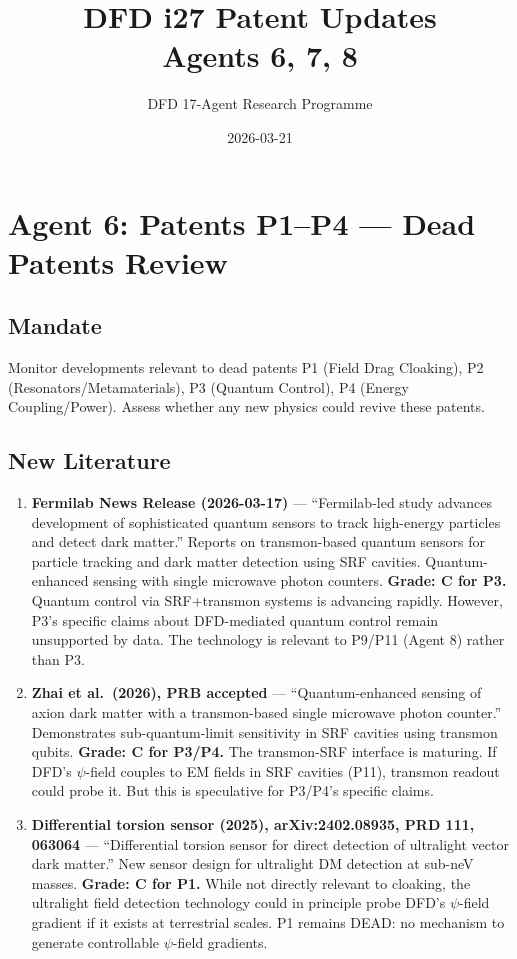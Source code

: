 \documentclass[11pt,a4paper]{article}
\title{DFD i27 Patent Updates\\Agents 6, 7, 8}
\author{DFD 17-Agent Research Programme}
\date{2026-03-21}
\begin{document}
\maketitle
\tableofcontents
\newpage

\section{Agent 6: Patents P1--P4 --- Dead Patents Review}

\subsection{Mandate}
Monitor developments relevant to dead patents P1 (Field Drag Cloaking), P2 (Resonators/Metamaterials), P3 (Quantum Control), P4 (Energy Coupling/Power). Assess whether any new physics could revive these patents.

\subsection{New Literature}

\begin{enumerate}

\item \textbf{Fermilab News Release (2026-03-17)} --- ``Fermilab-led study advances development of sophisticated quantum sensors to track high-energy particles and detect dark matter.'' Reports on transmon-based quantum sensors for particle tracking and dark matter detection using SRF cavities. Quantum-enhanced sensing with single microwave photon counters. \textbf{Grade: C for P3.} Quantum control via SRF+transmon systems is advancing rapidly. However, P3's specific claims about DFD-mediated quantum control remain unsupported by data. The technology is relevant to P9/P11 (Agent 8) rather than P3.

\item \textbf{Zhai et al.\ (2026), PRB accepted} --- ``Quantum-enhanced sensing of axion dark matter with a transmon-based single microwave photon counter.'' Demonstrates sub-quantum-limit sensitivity in SRF cavities using transmon qubits. \textbf{Grade: C for P3/P4.} The transmon-SRF interface is maturing. If DFD's $\psi$-field couples to EM fields in SRF cavities (P11), transmon readout could probe it. But this is speculative for P3/P4's specific claims.

\item \textbf{Differential torsion sensor (2025), arXiv:2402.08935, PRD 111, 063064} --- ``Differential torsion sensor for direct detection of ultralight vector dark matter.'' New sensor design for ultralight DM detection at sub-neV masses. \textbf{Grade: C for P1.} While not directly relevant to cloaking, the ultralight field detection technology could in principle probe DFD's $\psi$-field gradient if it exists at terrestrial scales. P1 remains DEAD: no mechanism to generate controllable $\psi$-field gradients.

\end{enumerate}
\end{document}
